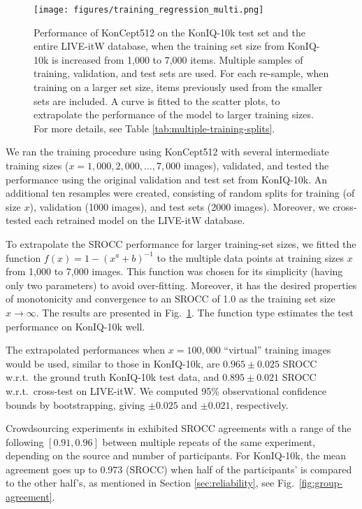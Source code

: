 \documentclass[10pt,journal,compsoc]{IEEEtran}
\begin{document}
\begin{figure}[!t]
\vspace{-10pt}
\centering
\texttt{[image: figures/training\_regression\_multi.png]}
\caption{Performance of KonCept512 on the KonIQ-10k test set and the entire LIVE-itW database, when the training set size from KonIQ-10k is increased from 1,000 to 7,000 items. Multiple samples of training, validation, and test sets are used. For each re-sample, when training on a larger set size, items previously used from the smaller sets are included. A curve is fitted to the scatter plots, to extrapolate the performance of the model to larger training sizes. For more details, see Table \ref{tab:multiple-training-splits}.}
\label{fig:extrapolation-live}
\vspace{-15pt}
\end{figure}
We ran the training procedure using KonCept512 with several intermediate training sizes ($x = 1,000, 2,000, \ldots, 7,000$ images), validated, and tested the performance using the original validation and test set from KonIQ-10k. An additional ten resamples were created, consisting of random splits for training (of size $x$), validation (1000 images), and test sets (2000 images). Moreover, we cross-tested each retrained model on the LIVE-itW database.

To extrapolate the SROCC performance for larger training-set sizes, we fitted the function $f(x) = 1 - (x^a + b)^{-1}$ to the multiple data points at training sizes $x$ from 1,000 to 7,000 images. This function was chosen for its simplicity (having only two parameters) to avoid over-fitting. Moreover, it has the desired properties of monotonicity and convergence to an SROCC of 1.0 as the training set size $x \rightarrow \infty$. The results are presented in Fig.~\ref{fig:extrapolation-live}.  The function type estimates the test performance on KonIQ-10k well.

The extrapolated performances when $x = 100,000$ ``virtual'' training images would be used, similar to those in KonIQ-10k, are $0.965\pm0.025$ SROCC w.r.t.\ the ground truth KonIQ-10k test data, and $0.895\pm0.021$ SROCC w.r.t.\ cross-test on LIVE-itW. We computed 95\% observational confidence bounds by bootstrapping, giving  $\pm0.025$ and $\pm0.021$, respectively. 


Crowdsourcing experiments in \cite{QoMEXReliability,ponomarenko:2009tid2008} exhibited SROCC agreements with a range of the following $[0.91,0.96]$ between multiple repeats of the same experiment, depending on the source and number of participants. For KonIQ-10k, the mean agreement goes up to $0.973$ (SROCC) when half of the participants' is compared to the other half's, as mentioned in Section \ref{sec:reliability}, see Fig.~\ref{fig:group-agreement}. 
\end{document}
